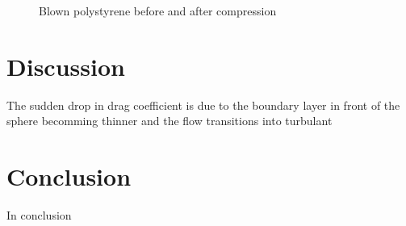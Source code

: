 \documentclass{article}
\begin{document}
\begin{figure}[H]
\centering
{}%
\qquad
{}%
\caption{\label{fig:polystyrene} Blown polystyrene before and after compression}
\end{figure}

\section{Discussion}

The sudden drop in drag coefficient is due to the boundary layer in front of the sphere becomming thinner and the flow transitions into turbulant 


\section{Conclusion}

In conclusion
\end{document}
